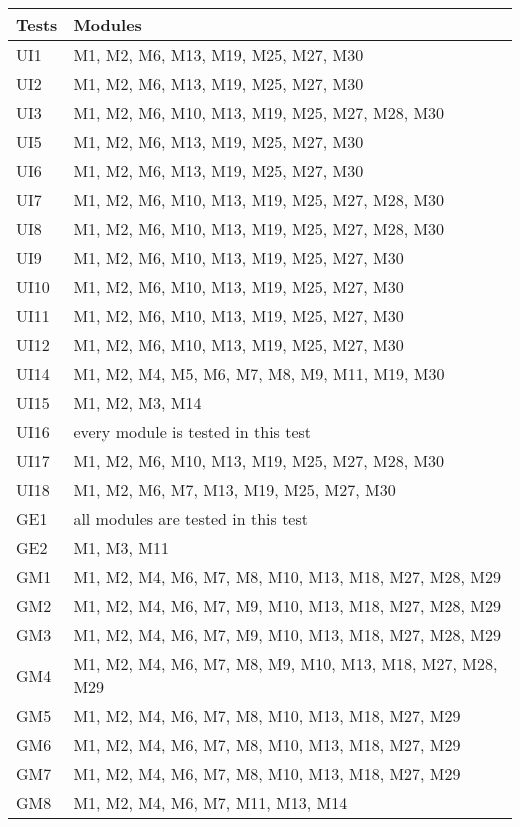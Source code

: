 \documentclass[12pt, titlepage]{article}
\begin{document}
\begin{longtable}{p{} p{}}
\toprule
\textbf{Tests} & \textbf{Modules}\\
\midrule
UI1 & M1, M2, M6, M13, M19, M25, M27, M30\\
UI2 & M1, M2, M6, M13, M19, M25, M27, M30\\
UI3 & M1, M2, M6, M10, M13, M19, M25, M27, M28, M30\\
UI5 & M1, M2, M6, M13, M19, M25, M27, M30\\
UI6 & M1, M2, M6, M13, M19, M25, M27, M30\\
UI7 & M1, M2, M6, M10, M13, M19, M25, M27, M28, M30\\
UI8 & M1, M2, M6, M10, M13, M19, M25, M27, M28, M30\\
UI9 & M1, M2, M6, M10, M13, M19, M25, M27, M30\\
UI10 & M1, M2, M6, M10, M13, M19, M25, M27, M30\\
UI11 & M1, M2, M6, M10, M13, M19, M25, M27, M30\\
UI12 & M1, M2, M6, M10, M13, M19, M25, M27, M30\\
UI14 & M1, M2, M4, M5, M6, M7, M8, M9, M11, M19, M30\\
UI15 & M1, M2, M3, M14\\
UI16 & every module is tested in this test\\
UI17 & M1, M2, M6, M10, M13, M19, M25, M27, M28, M30\\
UI18 & M1, M2, M6, M7, M13, M19, M25, M27, M30\\
GE1 & all modules are tested in this test\\
GE2 & M1, M3, M11\\
GM1 & M1, M2, M4, M6, M7, M8, M10, M13, M18, M27, M28, M29\\
GM2 & M1, M2, M4, M6, M7, M9, M10, M13, M18, M27, M28, M29\\
GM3 & M1, M2, M4, M6, M7, M9, M10, M13, M18, M27, M28, M29\\
GM4 & M1, M2, M4, M6, M7, M8, M9, M10, M13, M18, M27, M28, M29\\
GM5 & M1, M2, M4, M6, M7, M8, M10, M13, M18, M27, M29\\
GM6 & M1, M2, M4, M6, M7, M8, M10, M13, M18, M27, M29\\
GM7 &  M1, M2, M4, M6, M7, M8, M10, M13, M18, M27, M29\\
GM8 & M1, M2, M4, M6, M7, M11, M13, M14\\

\end{longtable}
\end{document}
